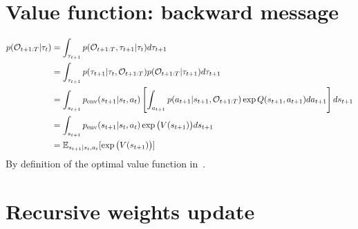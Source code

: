 \section{Value function: backward message}
 \label{app:backward_message}
\begin{align}
    p({\mathcal{O}}_{t+1:T} | \tau_t) &=  \int_{\tau_{t+1}} p({\mathcal{O}}_{t+1:T}, \tau_{t+1} | \tau_t)d\tau_{t+1} \nonumber\\
     &=  \int_{\tau_{t+1}} p(\tau_{t+1} | \tau_{t}, {\mathcal{O}}_{t+1:T}) p({\mathcal{O}}_{t+1:T} | \tau_{t+1}) d\tau_{t+1}  \nonumber\\
     &= \int_{s_{t+1}}  p_{\text{env}}(s_{t+1} | s_t, a_t) \left[ \int_{a_{t+1}} p(a_{t+1} | s_{t+1}, {\mathcal{O}}_{t+1:T}) \exp Q(s_{t+1}, a_{t+1}) da_{t+1}  \right] ds_{t+1}\nonumber\\
     &= \int_{s_{t+1}} p_{\text{env}}(s_{t+1} | s_t, a_t)  \exp \big( V(s_{t+1}) \big) ds_{t+1}\nonumber\\
       &= \mathbb{E}_{s_{t+1} | s_t, a_t} [ \exp \big( V(s_{t+1}) \big)]
\end{align}
By definition of the optimal value function in~\citep{levine2018reinforcement}.


\section{Recursive weights update}


